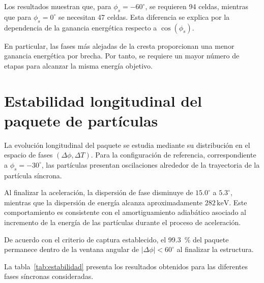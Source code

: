 Los resultados muestran que, para $\phi_s=-60^\circ$, se requieren 94 celdas, mientras que para $\phi_s=0^\circ$ se necesitan 47 celdas. Esta diferencia se explica por la dependencia de la ganancia energética respecto a $\cos(\phi_s)$.

En particular, las fases más alejadas de la cresta proporcionan una menor ganancia energética por brecha. Por tanto, se requiere un mayor número de etapas para alcanzar la misma energía objetivo.

\section{Estabilidad longitudinal del paquete de partículas}

La evolución longitudinal del paquete se estudia mediante su distribución en el espacio de fases $(\Delta\phi,\Delta T)$. Para la configuración de referencia, correspondiente a $\phi_s=-30^\circ$, las partículas presentan oscilaciones alrededor de la trayectoria de la partícula síncrona.

Al finalizar la aceleración, la dispersión de fase disminuye de $15.0^\circ$ a $5.3^\circ$, mientras que la dispersión de energía alcanza aproximadamente $282\,\mathrm{keV}$. Este comportamiento es consistente con el amortiguamiento adiabático asociado al incremento de la energía de las partículas durante el proceso de aceleración.

De acuerdo con el criterio de captura establecido, el \SI{99.3}{\percent} del paquete permanece dentro de la ventana angular de $|\Delta\phi|<60^\circ$ al finalizar la estructura.

La tabla~\ref{tab:estabilidad} presenta los resultados obtenidos para las diferentes fases síncronas consideradas.

